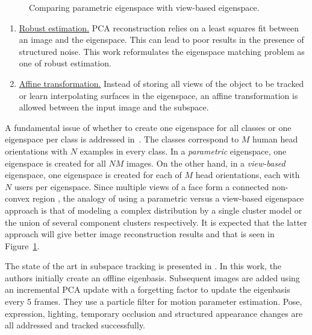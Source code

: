 \begin{Body}
\begin{figure}[t]
\caption{Comparing parametric eigenspace with view-based eigenspace.}								
\label{fig:parametric_vs_viewBased_eigenspace}				
\end{figure}

\begin{enumerate}
\item \underline{Robust estimation.}  PCA reconstruction relies on a least squares fit between an image and the eigenspace.  This can lead to poor results in the presence of structured noise.  This work reformulates the eigenspace matching problem as one of robust estimation.
\item \underline{Affine transformation.} Instead of storing all views of the object to be tracked or learn interpolating surfaces in the eigenspace, an affine transformation is allowed between the input image and the subspace.
\end{enumerate}

A fundamental issue of whether to create one eigenspace for all classes or one eigenspace per class is addressed in~\cite{1997_JNL_EigenTRK_Moghaddam}.  The classes correspond to $M$ human head orientations with $N$ examples in every class.  In a \emph{parametric} eigenspace, one eigenspace is created for all $NM$ images.  On the other hand, in a \emph{view-based} eigenspace, one eigenspace is created for each of $M$ head orientations, each with $N$ users per eigenspace.  Since multiple views of a face form a connected non-convex region \cite{1994_JNL_FaceTop_Bichsel}, the analogy of using a parametric versus a view-based eigenspace approach is that of modeling a complex distribution by a single cluster model or the union of several component clusters respectively.  It is expected that the latter approach will give better image reconstruction results and that is seen in Figure~\ref{fig:parametric_vs_viewBased_eigenspace}.  

The state of the art in subspace tracking is presented in \cite{2008_JNL_subspaceTRK_Ross}.  In this work, the authors initially create an offline eigenbasis.  Subsequent images are added using an incremental PCA update with a forgetting factor to update the eigenbasis every 5 frames.  They use a particle filter for motion parameter estimation.  Pose, expression, lighting, temporary occlusion and structured appearance changes are all addressed and tracked successfully.


\end{Body}
